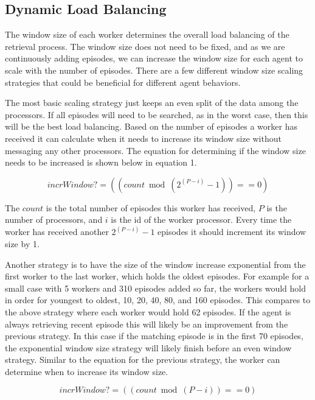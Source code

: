 \documentclass[11pt]{article} %
\begin{document}
\subsection{Dynamic Load Balancing}

The window size of each worker determines the overall load balancing of the
retrieval process. The window size does not need to be fixed, and as we are
continuously adding episodes, we can increase the window size for each agent to
scale with the number of episodes. There are a few different window size scaling
strategies that could be beneficial for different agent behaviors.

The most basic scaling strategy just keeps an even split of the data among the
processors. If all episodes will need to be searched, as in the worst case, then
this will be the best load balancing. Based on the number of episodes a worker
has received it can calculate when it needs to increase its window size without
messaging any other processors. The equation for determining if the window size
needs to be increased is shown below in equation 1.

\begin{equation}incrWindow? = ((count  \bmod  (2^{(P-i)} -1) ) == 0)\end{equation}

The $count$ is the total number of episodes this worker has received, $P$ is the
number of processors, and $i$ is the id of the worker processor. Every time the
worker has received another $ 2^(P-i) -1 $ episodes it should increment its window
size by 1.

Another strategy is to have the size of the window increase exponential from the
first worker to the last worker, which holds the oldest episodes. For example
for a small case with 5 workers and 310 episodes added so far, the workers would
hold in order for youngest to oldest, 10, 20, 40, 80, and 160 episodes. This
compares to the above strategy where each worker would hold 62 episodes. If the
agent is always retrieving recent episode this will likely be an improvement
from the previous strategy. In this case if the matching episode is in the first
70 episodes, the exponential window size strategy will likely finish before an
even window strategy. Similar to the equation for the previous strategy, the
worker can determine when to increase its window size.

\begin{equation}incrWindow? = ((count  \bmod  (P-i) ) == 0)\label{eq.1}\end{equation}
\end{document}
